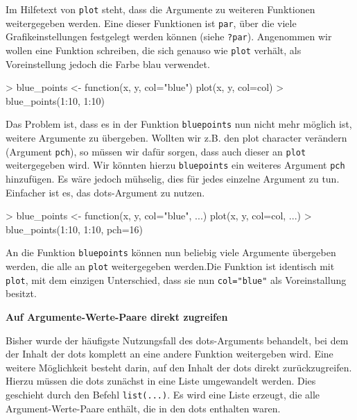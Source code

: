 \documentclass[12pt, a4paper,twoside,openany,x11names,svgnames]{memoir}
\begin{document}
Im Hilfetext von \texttt{plot} steht, dass die Argumente zu weiteren Funktionen weitergegeben werden. Eine dieser Funktionen ist \texttt{par}, über die viele Grafikeinstellungen festgelegt werden können (siehe \verb+?par+). Angenommen wir wollen eine Funktion schreiben, die sich genauso wie \texttt{plot} verhält, als Voreinstellung jedoch die Farbe blau verwendet.

\begin{Schunk}
\begin{Sinput}
> blue_points <- function(x, y, col="blue") {
   plot(x, y, col=col)
 }
> blue_points(1:10, 1:10)
\end{Sinput}
\end{Schunk}

Das Problem ist, dass es in der Funktion \texttt{blue\textunderscore{}points} nun nicht mehr möglich ist, weitere Argumente zu übergeben. Wollten wir z.B. den plot character verändern (Argument \texttt{pch}), so müssen wir dafür sorgen, dass auch dieser an \texttt{plot} weitergegeben wird. Wir könnten hierzu \texttt{blue\textunderscore{}points} ein weiteres Argument \texttt{pch} hinzufügen. Es wäre jedoch mühselig, dies für jedes einzelne Argument zu tun. Einfacher ist es, das dots-Argument zu nutzen.

\begin{Schunk}
\begin{Sinput}
> blue_points <- function(x, y, col="blue", ...) {
   plot(x, y, col=col, ...)
 }
> blue_points(1:10, 1:10, pch=16)
\end{Sinput}
\end{Schunk}

An die Funktion \texttt{blue\textunderscore{}points} können nun beliebig viele Argumente übergeben werden, die alle an \texttt{plot} weitergegeben werden.Die Funktion ist identisch mit \texttt{plot}, mit dem einzigen Unterschied, dass sie nun \texttt{col="blue"} als Voreinstallung besitzt.


\vspace*{5mm}

\textbf{Auf Argumente-Werte-Paare direkt zugreifen}

Bisher wurde der häufigste Nutzungsfall des dots-Arguments behandelt, bei dem der Inhalt der dots komplett an eine andere Funktion weitergeben wird. Eine weitere Möglichkeit besteht darin, auf den Inhalt der dots direkt zurückzugreifen. Hierzu müssen die dots zunächst in eine Liste umgewandelt werden. Dies geschieht durch den Befehl \texttt{list(...)}. Es wird eine Liste erzeugt, die alle Argument-Werte-Paare enthält, die in den dots enthalten waren.
\end{document}
